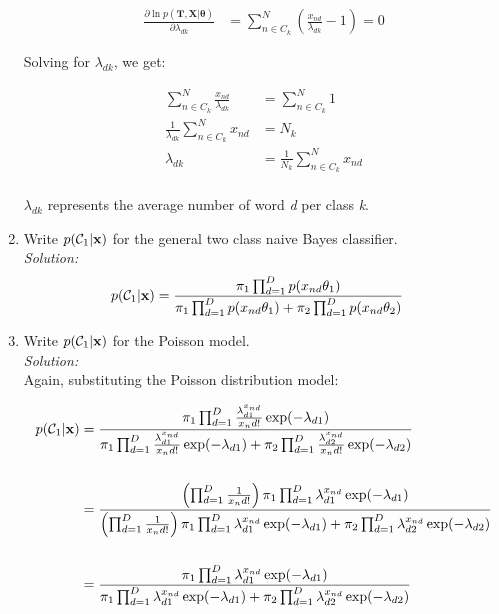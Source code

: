 \documentclass[12pt,a4paper]{article}
\newcommand{\lp}{\left(}
\newcommand{\rp}{\right)}
\newcommand{\xscalar}{x}
\newcommand{\xvec}{{\bf \xscalar}}
\newcommand{\class}{\mathcal{C}}
\begin{document}
\begin{enumerate}
		\begin{align*}
			\frac{\partial \ln p(\textbf{T},\textbf{X} | \boldsymbol{\theta})}{\partial \lambda_{dk}} &= \sum_{n \in C_k}^{N}(\frac{x_{nd}}{\lambda_{dk}} - 1) = 0
		\end{align*}
		
		Solving for $\lambda_{dk}$, we get:
		
		\begin{align*}
			\sum_{n \in C_k}^{N} \frac{x_{nd}}{\lambda_{dk}} &= \sum_{n \in C_k}^{N} 1 \\
			\frac{1}{\lambda_{dk}} \sum_{n \in C_k}^{N}x_{nd} &= N_k \\
			\lambda_{dk} &= \frac{1}{N_k} \sum_{n \in C_k}^{N} x_{nd}\\
		\end{align*}
		
		$\lambda_{dk}$ represents the average number of word \textit{d} per class \textit{k}.      
		
		\item Write $p(\class_{1} | \xvec)$ for the general two class naive Bayes classifier.\\
		\emph{Solution:} \\
		\begin{align*}
			p(\class_{1} | \xvec) &= \frac{\pi_1 \prod_{d = 1}^{D}p(x_{nd}\theta_1)}{\pi_1 \prod_{d = 1}^{D}p(x_{nd}\theta_1) + \pi_2 \prod_{d = 1}^{D}p(x_{nd}\theta_2)}
		\end{align*}
		
		\item Write $p(\class_{1} | \xvec)$ for the Poisson model. \\
		\emph{Solution:} \\
		Again, substituting the Poisson distribution model:
		
		\begin{align*}
			p(\class_{1} | \xvec) &= \frac{\pi_1 \prod_{d = 1}^{D} \frac{\lambda_{d1}^{x_{nd}}}{x_nd!} \exp(-\lambda_{d1})} {\pi_1 \prod_{d = 1}^{D} \frac{\lambda_{d1}^{x_{nd}}}{x_nd!} \exp(-\lambda_{d1}) + \pi_2 \prod_{d=1}^{D} \frac{\lambda_{d2}^{x_{nd}}}{x_nd!} \exp(-\lambda_{d2})} \\\\
			&= \frac{ \lp \prod_{d=1}^{D}\frac{1}{x_nd!} \rp\pi_1 \prod_{d = 1}^{D} \lambda_{d1}^{x_{nd}} \exp(-\lambda_{d1})} {\lp \prod_{d=1}^{D}\frac{1}{x_nd!} \rp \pi_1 \prod_{d = 1}^{D}\lambda_{d1}^{x_{nd}} \exp(-\lambda_{d1}) + \pi_2 \prod_{d=1}^{D}\lambda_{d2}^{x_{nd}} \exp(-\lambda_{d2})} \\\\
			&= \frac{\pi_1 \prod_{d = 1}^{D} \lambda_{d1}^{x_{nd}} \exp(-\lambda_{d1})} {\pi_1 \prod_{d = 1}^{D}\lambda_{d1}^{x_{nd}} \exp(-\lambda_{d1}) + \pi_2 \prod_{d=1}^{D}\lambda_{d2}^{x_{nd}} \exp(-\lambda_{d2})}\\
		\end{align*}	
		

\end{enumerate}
\end{document}
